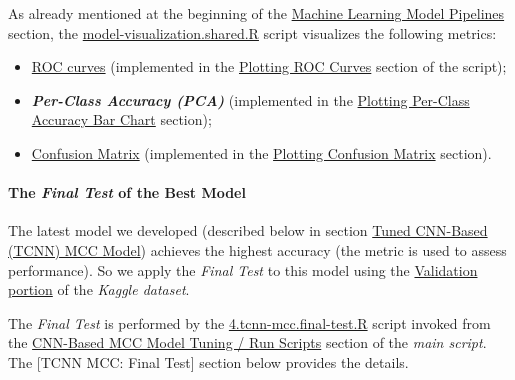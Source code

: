\documentclass[
]{report}
\providecommand{\tightlist}{%
  \setlength{\itemsep}{0pt}\setlength{\parskip}{0pt}}
\begin{document}
As already mentioned at the beginning of the \hyperref[machine-learning-model-pipelines]{Machine Learning Model Pipelines} section, the \href{https://github.com/AzKurban-edX-DS/edx.capstone.choose-your-own/blob/main/r/models/model-visualization.shared.R}{model-visualization.shared.R} script visualizes the following metrics:

\begin{itemize}
\tightlist
\item
  \href{https://www.geeksforgeeks.org/machine-learning/roc-curves-for-multiclass-classification-in-r/}{ROC curves} (implemented in the \href{https://github.com/AzKurban-edX-DS/edx.capstone.choose-your-own/blob/main/r/models/model-visualization.shared.R\#L19-L32}{Plotting ROC Curves} section of the script);
\item
  \textbf{\emph{Per-Class Accuracy (PCA)}} (implemented in the \href{https://github.com/AzKurban-edX-DS/edx.capstone.choose-your-own/blob/main/r/models/model-visualization.shared.R\#L33-L45}{Plotting Per-Class Accuracy Bar Chart} section);
\item
  \href{https://cran.r-project.org/web/packages/cvms/vignettes/Creating_a_confusion_matrix.html}{Confusion Matrix} (implemented in the \href{https://github.com/AzKurban-edX-DS/edx.capstone.choose-your-own/blob/main/r/models/model-visualization.shared.R\#L46-L69}{Plotting Confusion Matrix} section).
\end{itemize}

\paragraph{\texorpdfstring{The \emph{Final Test} of the Best Model}{The Final Test of the Best Model}}\label{the-final-test-of-the-best-model}

The latest model we developed (described below in section \hyperref[tuned-cnn-based-tcnn-mcc-model]{Tuned CNN-Based (TCNN) MCC Model}) achieves the highest accuracy (the metric is used to assess performance). So we apply the \emph{Final Test} to this model using the \href{https://www.kaggle.com/datasets/vaibhao/handwritten-characters?select=Validation}{Validation portion} of the \emph{Kaggle dataset}.

The \emph{Final Test} is performed by the \href{https://github.com/AzKurban-edX-DS/edx.capstone.choose-your-own/blob/main/r/models/cnn/mcc/tuner/4.tcnn-mcc.final-test.R}{4.tcnn-mcc.final-test.R} script invoked from the \href{https://github.com/AzKurban-edX-DS/edx.capstone.choose-your-own/blob/main/r/index.R\#L885}{CNN-Based MCC Model Tuning / Run Scripts} section of the \emph{main script}. The {[}TCNN MCC: Final Test{]} section below provides the details.
\end{document}

